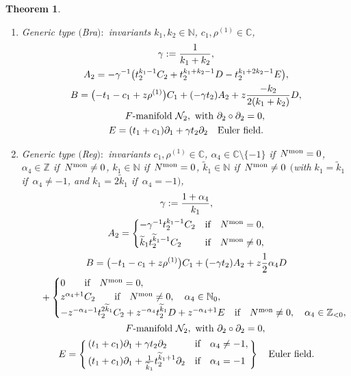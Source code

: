 \documentclass[pdftex]{sigma}%
\numberwithin{equation}{section}
\numberwithin{figure}{section}
\newcommand{\N}{{\mathbb N}}
\newcommand{\Z}{{\mathbb Z}}
\newcommand{\C}{{\mathbb C}}
\newcommand{\NN}{{\mathcal N}}
\newcommand{\www}{\widetilde}
\newcommand{\paa}{\partial}
\newtheorem{Theorem}{Theorem}[section]
\begin{document}
\begin{Theorem}
\begin{enumerate}
\begin{enumerate}
\item[$(ii)$] Generic type $($Bra$){:}$ invariants $k_1,k_2\in\N$,
$c_1,\rho^{(1)}\in\C$,
\begin{gather*}%
\gamma := \frac{1}{k_1+k_2},
\\
A_2=-\gamma^{-1}\big(t_2^{k_1-1}C_2+t_2^{k_1+k_2-1}D-t_2^{k_1+2k_2-1}E\big),
\\
B= \big({-}t_1-c_1+z\rho^{(1)}\big)C_1+(-\gamma t_2)A_2+ z\frac{-k_2}{2(k_1+k_2)}D,
\\ \hphantom{B= }
\text{$F$-manifold }\NN_2,
\text{ with }\paa_2\circ\paa_2=0,
\\
E= (t_1+c_1)\paa_1 +\gamma t_2\paa_2\quad\text{Euler field}.
\end{gather*}

\item[$(iii)$] Generic type $($Reg$){:}$
invariants $c_1,\rho^{(1)}\in\C$,
$\alpha_4\in\C\setminus\{-1\}$ if~$N^{\rm mon}=0$,
$\alpha_4\in\Z$ if~$N^{\rm mon}\neq 0$,
$k_1\in\N$ if~$N^{\rm mon}=0$,
$\www k_1\in\N$ if~$N^{\rm mon}\neq 0$
$($with $k_1=\www k_1$ if~$\alpha_4\neq -1$,
and $k_1=2\www k_1$ if~$\alpha_4=-1)$,
\begin{gather*}%
\gamma := \frac{1+\alpha_4}{k_1},
\\
A_2=\begin{cases}
-\gamma^{-1}t_2^{k_1-1}C_2&\text{if}\quad N^{\rm mon}=0,
\\[.5ex]
\www k_1t_2^{\www k_1-1}C_2&\text{if}\quad N^{\rm mon}\neq 0,
\end{cases}
\\
B= \big({-}t_1-c_1+z\rho^{(1)}\big)C_1+(-\gamma t_2)A_2+z\frac{1}{2}\alpha_4 D
\\ \hphantom{B= }
{}+ \begin{cases}
0 \qquad\text{if}\quad N^{\rm mon}=0,
\\
z^{\alpha_4+1}C_2\qquad\text{if}\quad N^{\rm mon}\neq 0,\quad
\alpha_4\in\N_0,
\\
-z^{-\alpha_4-1}t_2^{2\www k_1}C_2 +z^{-\alpha_4}t_2^{\www k_1}D+
z^{-\alpha_4+1}E\quad\text{if}\quad N^{\rm mon}\neq 0,\quad
\alpha_4\in\Z_{<0},\!\!\!\!\end{cases}
\\ \hphantom{B= }
\text{$F$-manifold }\NN_2,\
\text{with}\ \paa_2\circ\paa_2=0,
\\
E= \left\{\!\!\begin{array}{ll}
(t_1+c_1)\paa_1 +\gamma t_2\paa_2&\text{if}\quad\alpha_4\neq -1,\\[.5ex]
(t_1+c_1)\paa_1 +\frac{1}{\www k_1}t_2^{\www k_1+1} \paa_2
&\text{if}\quad\alpha_4=-1\end{array}\!\!\right\}
\quad\text{Euler field}.
\end{gather*}


\end{enumerate}
\end{enumerate}
\end{Theorem}
\end{document}
